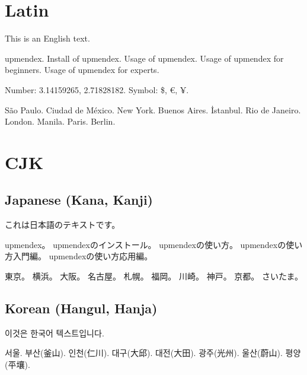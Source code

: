 \documentclass[a4paper]{ujarticle}
\begin{document}
\section{Latin}
This is an English text.

upmendex.
Install of upmendex.
Usage of upmendex.
Usage of upmendex for beginners.
Usage of upmendex for experts.

Number: 3.14159265, 2.71828182.
Symbol: \$\index{\$}, €, ¥.

São Paulo.
Ciudad de México.
New York.
Buenos Aires.
İstanbul.
Rio de Janeiro.
London.
Manila.
Paris.
Berlin.

\section{CJK}
\subsection{Japanese (Kana, Kanji)}
これは日本語のテキストです。

upmendex。
upmendexのインストール。
upmendexの使い方。
upmendexの使い方入門編。
upmendexの使い方応用編。

東京。
横浜。
大阪。
名古屋。
札幌。
福岡。
川崎。
神戸。
京都。
さいたま。

\subsection{Korean (Hangul, Hanja)}
\begin{otherlanguage}{korean}
이것은 한국어 텍스트입니다.

서울.
부산(釜山).
인천(仁川).
대구(大邱).
대전(大田).
광주(光州).
울산(蔚山).
평양(平壤).
\end{otherlanguage}
\end{document}
